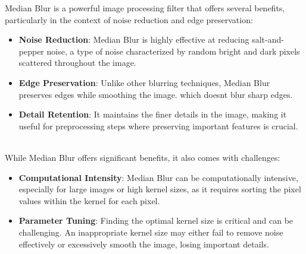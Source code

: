 \quad Median Blur is a powerful image processing filter that offers several
benefits, particularly in the context of noise reduction and edge
preservation:\\

\begin{itemize}
\item
  \textbf{Noise Reduction}: Median Blur is highly effective at reducing
  \textquotesingle salt-and-pepper\textquotesingle{} noise, a type of
  noise characterized by random bright and dark pixels scattered
  throughout the image.
\item
  \textbf{Edge Preservation}: Unlike other blurring techniques, Median
  Blur preserves edges while smoothing the image. which doesn\textquotesingle t blur sharp
  edges.
\item
  \textbf{Detail Retention}: It maintains the finer details in the
  image, making it useful for preprocessing steps where preserving
  important features is crucial.
\end{itemize}\\

\quad While Median Blur offers significant benefits, it also comes with
challenges:\\

\begin{itemize}
\item
  \textbf{Computational Intensity}: Median Blur can be computationally
  intensive, especially for large images or high kernel sizes, as it
  requires sorting the pixel values within the kernel for each pixel.
\item
  \textbf{Parameter Tuning}: Finding the optimal kernel size is critical
  and can be challenging. An inappropriate kernel size may either fail
  to remove noise effectively or excessively smooth the image, losing
  important details.
\end{itemize}\\

